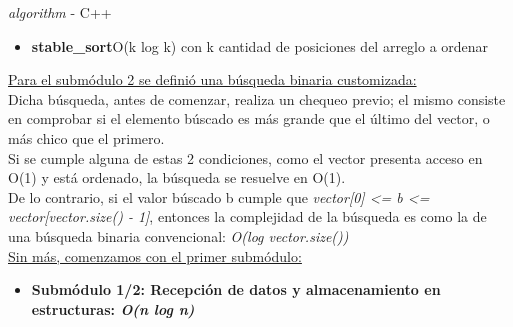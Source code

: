 \documentclass[10pt,a4paper]{article}
\begin{document}
\indent \textit{algorithm} - C++
\begin{itemize}
\item \textbf{stable\_sort}\hspace{11 px}O(k log k) con k cantidad de posiciones del arreglo a ordenar
\end{itemize}

\noindent \underline{Para el submódulo 2 se definió una búsqueda binaria customizada:}\\
Dicha búsqueda, antes de comenzar, realiza un chequeo previo; el mismo consiste en comprobar si el elemento búscado es más grande que el último del vector, o más chico que el primero.\\
Si se cumple alguna de estas 2 condiciones, como el vector presenta acceso en O(1) y está ordenado, la búsqueda se resuelve en O(1).\\
De lo contrario, si el valor búscado b cumple que \textit{vector[0] \textless = b \textless = vector[vector.size() - 1]}, entonces la complejidad de la búsqueda es como la de una búsqueda binaria convencional: \textit{O(log vector.size())}\\

\underline{Sin más, comenzamos con el primer submódulo:}

\begin{itemize}
\item \textbf{Submódulo 1/2: Recepción de datos y almacenamiento en estructuras: \textit{O(n log n)}}\\
\end{itemize}
\end{document}
